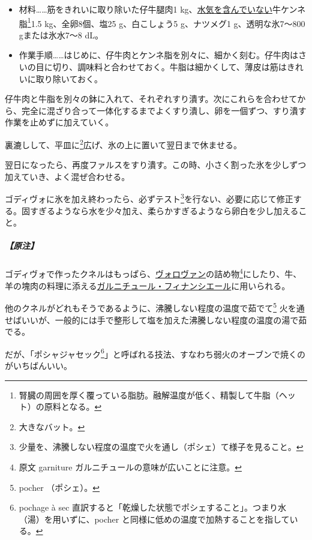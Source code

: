 

\begin{itemize}
\item
  材料\ldots{}\ldots{}筋をきれいに取り除いた仔牛腿肉1
  kg、\ul{水気を含んでいない}牛ケンネ脂\footnote{腎臓の周囲を厚く覆っている脂肪。融解温度が低く、精製して牛脂（ヘット）の原料となる。}1.5
  kg、全卵8個、塩25 g、白こしょう5 g、ナツメグ1 g、透明な氷7〜800
  gまたは氷水7〜8 dL。
\item
  作業手順\ldots{}\ldots{}はじめに、仔牛肉とケンネ脂を別々に、細かく刻む。仔牛肉はさいの目に切り、調味料と合わせておく。牛脂は細かくして、薄皮は筋はきれいに取り除いておく。
\end{itemize}

仔牛肉と牛脂を別々の鉢に入れて、それぞれすり潰す。次にこれらを合わせてから、完全に混ざり合って一体化するまでよくすり潰し、卵を一個ずつ、すり潰す作業を止めずに加えていく。

裏漉しして、平皿に\footnote{大きなバット。}広げ、氷の上に置いて翌日まで休ませる。

翌日になったら、再度ファルスをすり潰す。この時、小さく割った氷を少しずつ加えていき、よく混ぜ合わせる。

ゴディヴォに氷を加え終わったら、必ずテスト\footnote{少量を、沸騰しない程度の温度で火を通し（ポシェ）て様子を見ること。}を行ない、必要に応じて修正する。固すぎるようなら水を少々加え、柔らかすぎるようなら卵白を少し加えること。

\hypertarget{nota-godiveau-a}{%
\subparagraph{【原注】}\label{nota-godiveau-a}}

ゴディヴォで作ったクネルはもっぱら、\protect\hyperlink{vol-au-vent}{ヴォロヴァン}の詰め物\footnote{原文
  garniture ガルニチュールの意味が広いことに注意。}にしたり、牛、羊の塊肉の料理に添える\protect\hyperlink{garniture-a-la-financiere}{ガルニチュール・フィナンシエール}に用いられる。

他のクネルがどれもそうであるように、沸騰しない程度の温度で茹でて\footnote{pocher
  （ポシェ）。}
火を通せばいいが、一般的には手で整形して塩を加えた沸騰しない程度の温度の湯で茹でる。

だが、「ポシャジャセック\footnote{pochage à sec
  直訳すると「乾燥した状態でポシェすること」。つまり水（湯）を用いずに、pocher
  と同様に低めの温度で加熱することを指している。}」と呼ばれる技法、すなわち弱火のオーブンで焼くのがいちばんいい。

